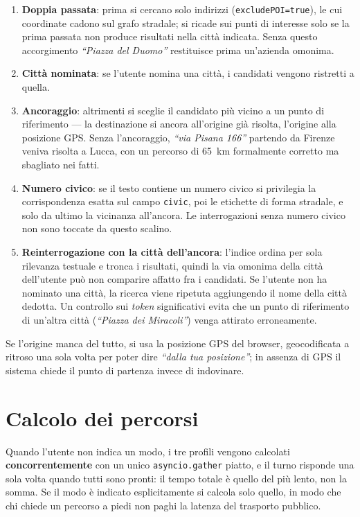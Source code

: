 \documentclass[a4paper,oneside]{Tptesi2}
\begin{document}
\begin{enumerate}
  \item \textbf{Doppia passata}: prima si cercano solo indirizzi
        (\texttt{excludePOI=true}), le cui coordinate cadono sul grafo stradale; si
        ricade sui punti di interesse solo se la prima passata non produce risultati
        nella citt\`a indicata. Senza questo accorgimento
        \emph{``Piazza del Duomo''} restituisce prima un'azienda omonima.
  \item \textbf{Citt\`a nominata}: se l'utente nomina una citt\`a, i candidati vengono
        ristretti a quella.
  \item \textbf{Ancoraggio}: altrimenti si sceglie il candidato pi\`u vicino a un punto
        di riferimento --- la destinazione si ancora all'origine gi\`a risolta,
        l'origine alla posizione GPS. Senza l'ancoraggio, \emph{``via Pisana 166''}
        partendo da Firenze veniva risolta a Lucca, con un percorso di 65~km
        formalmente corretto ma sbagliato nei fatti.
  \item \textbf{Numero civico}: se il testo contiene un numero civico si privilegia la
        corrispondenza esatta sul campo \texttt{civic}, poi le etichette di forma
        stradale, e solo da ultimo la vicinanza all'ancora. Le interrogazioni senza
        numero civico non sono toccate da questo scalino.
  \item \textbf{Reinterrogazione con la citt\`a dell'ancora}: l'indice ordina per sola
        rilevanza testuale e tronca i risultati, quindi la via omonima della citt\`a
        dell'utente pu\`o non comparire affatto fra i candidati. Se l'utente non ha
        nominato una citt\`a, la ricerca viene ripetuta aggiungendo il nome della
        citt\`a dedotta. Un controllo sui \emph{token} significativi evita che un punto
        di riferimento di un'altra citt\`a (\emph{``Piazza dei Miracoli''}) venga
        attirato erroneamente.
\end{enumerate}

Se l'origine manca del tutto, si usa la posizione GPS del browser, geocodificata a
ritroso una sola volta per poter dire \emph{``dalla tua posizione''}; in assenza di GPS
il sistema chiede il punto di partenza invece di indovinare.

\section{Calcolo dei percorsi}

Quando l'utente non indica un modo, i tre profili vengono calcolati
\textbf{concorrentemente} con un unico \texttt{asyncio.gather} piatto, e il turno
risponde una sola volta quando tutti sono pronti: il tempo totale \`e quello del pi\`u
lento, non la somma. Se il modo \`e indicato esplicitamente si calcola solo quello, in
modo che chi chiede un percorso a piedi non paghi la latenza del trasporto pubblico.
\end{document}
